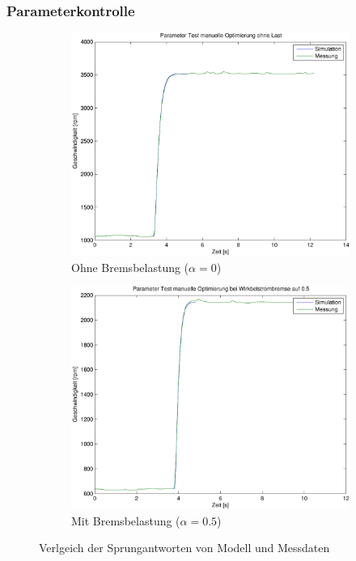 \subsubsection{Parameterkontrolle}
\begin{figure}[h!]
	\centering
	\begin{subfigure}{0.475\textwidth}
		\includegraphics[width=1\textwidth]{07/parameter_test_noload_man.pdf}
		\caption{Ohne Bremsbelastung ($\alpha = 0$)}
	\end{subfigure}
	\begin{subfigure}{0.475\textwidth}
		\includegraphics[width=1\textwidth]{07/parameter_test_load_man.pdf}
		\caption{Mit Bremsbelastung ($\alpha = 0.5$)}
	\end{subfigure}
	\caption{Verlgeich der Sprungantworten von Modell und Messdaten}
\end{figure}

